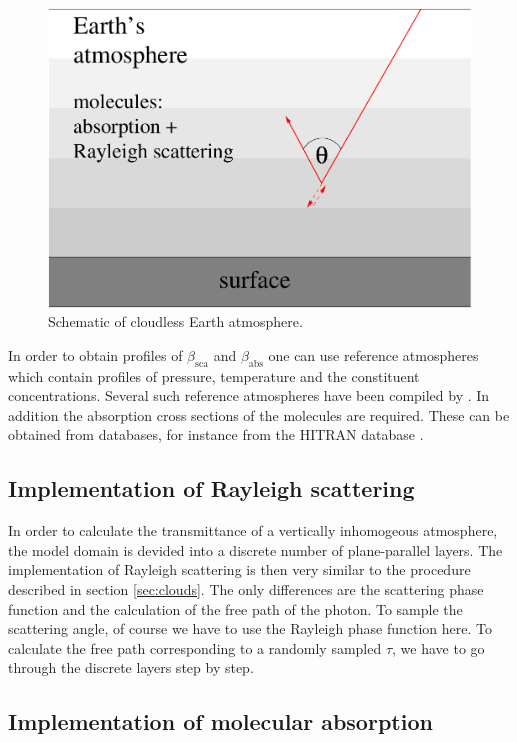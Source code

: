 \documentclass[12pt,twoside,a4paper]{article}
\begin{document}
\begin{figure}[htbp]
  \centering
  \includegraphics[width=0.8\hsize]{./figs/domain_clear.pdf}
  \caption{Schematic of cloudless Earth atmosphere.}
    \label{fig:clear}
\end{figure}

In order to obtain profiles of $\beta_\mathrm{sca}$ and $\beta_\mathrm{abs}$ one can
use reference atmospheres which contain profiles of
pressure, temperature and the constituent concentrations.
Several such reference atmospheres have been compiled by 
\citet{Anderson1986}. In addition the absorption cross sections of the
molecules are required. These can be obtained from databases, for
instance from the HITRAN database \citep{Rothman1987}. 

\subsection{Implementation of Rayleigh scattering}

In order to calculate the transmittance of a vertically inhomogeous
atmosphere, the model domain is devided into a discrete number of
plane-parallel layers. The implementation of Rayleigh scattering is
then very similar to the procedure described in section
\ref{sec:clouds}. The only differences are the scattering phase
function and the calculation of the free path of the photon. To sample
the scattering angle, of course we have to use the Rayleigh phase
function here. To calculate the free path corresponding to a randomly
sampled $\tau$, we have to go through the discrete layers step by step.

\subsection{Implementation of molecular absorption} 
\end{document}
